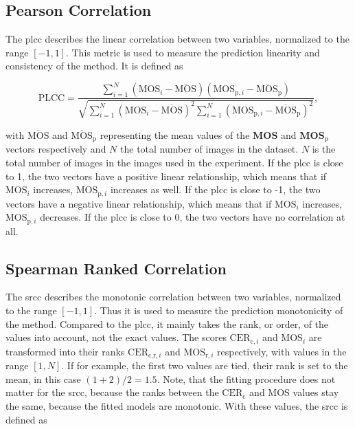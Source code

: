 \subsection{Pearson Correlation}
\label{subsec:pearson}

The \gls{plcc} \cite{pears_spear_2016} describes the linear correlation between two variables, normalized to the range $[-1, 1]$.
This metric is used to measure the prediction linearity and consistency of the method.
It is defined as

\begin{equation}
    \text{PLCC} = \frac{\sum_{i=1}^{N}{(\text{MOS}_{i}-\overline{\text{MOS}})(\text{MOS}_{\text{p},i}-\overline{\text{MOS}}_{\text{p}})}}{\sqrt{\sum_{i=1}^{N}{(\text{MOS}_{i}-\overline{\text{MOS}})^2}\sum_{i=1}^{N}{(\text{MOS}_{\text{p},i}-\overline{\text{MOS}}_{\text{p}})^2}}},
    \label{eq:pearson}
\end{equation}

with $\overline{\text{MOS}}$ and $\overline{\text{MOS}}_{\text{p}}$ representing the mean values of the $\mathbf{MOS}$ and $\mathbf{MOS}_{\text{p}}$ vectors respectively and $N$ the total number of images in the dataset.
$N$ is the total number of images in the images used in the experiment.
If the \gls{plcc} is close to 1, the two vectors have a positive linear relationship, which means that if $\text{MOS}_{i}$ increases, $\text{MOS}_{\text{p},i}$ increases as well.
If the \gls{plcc} is close to -1, the two vectors have a negative linear relationship, which means that if $\text{MOS}_{i}$ increases, $\text{MOS}_{\text{p},i}$ decreases.
If the \gls{plcc} is close to 0, the two vectors have no correlation at all.

\subsection{Spearman Ranked Correlation}
\label{subsec:spearman}

The \gls{srcc} \cite{pears_spear_2016} describes the monotonic correlation between two variables, normalized to the range $[-1, 1]$.
Thus it is used to measure the prediction monotonicity of the method.
Compared to the \gls{plcc}, it mainly takes the rank, or order, of the values into account, not the exact values.
The scores $\text{CER}_{\text{c},i}$ and $\text{MOS}_{i}$ are transformed into their ranks $\text{CER}_{\text{c,r},i}$ and $\text{MOS}_{\text{r},i}$ respectively, with values in the range $[1, N]$.
If for example, the first two values are tied, their rank is set to the mean, in this case $(1+2)/2 = 1.5$.
Note, that the fitting procedure does not matter for the \gls{srcc}, because the ranks between the $\text{CER}_{\text{c}}$ and $\text{MOS}$ values stay the same, because the fitted models are monotonic.
With these values, the \gls{srcc} is defined as

